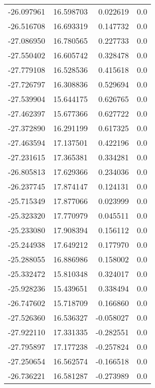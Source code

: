 \begin{tabular}{rrrr}
      -26.097961 &        16.598703 &    0.022619 &   0.0 \\
      -26.516708 &        16.693319 &    0.147732 &   0.0 \\
      -27.086950 &        16.780565 &    0.227733 &   0.0 \\
      -27.550402 &        16.605742 &    0.328478 &   0.0 \\
      -27.779108 &        16.528536 &    0.415618 &   0.0 \\
      -27.726797 &        16.308836 &    0.529694 &   0.0 \\
      -27.539904 &        15.644175 &    0.626765 &   0.0 \\
      -27.462397 &        15.677366 &    0.627722 &   0.0 \\
      -27.372890 &        16.291199 &    0.617325 &   0.0 \\
      -27.463594 &        17.137501 &    0.422196 &   0.0 \\
      -27.231615 &        17.365381 &    0.334281 &   0.0 \\
      -26.805813 &        17.629366 &    0.234036 &   0.0 \\
      -26.237745 &        17.874147 &    0.124131 &   0.0 \\
      -25.715349 &        17.877066 &    0.023999 &   0.0 \\
      -25.323320 &        17.770979 &    0.045511 &   0.0 \\
      -25.233080 &        17.908394 &    0.156112 &   0.0 \\
      -25.244938 &        17.649212 &    0.177970 &   0.0 \\
      -25.288055 &        16.886986 &    0.158002 &   0.0 \\
      -25.332472 &        15.810348 &    0.324017 &   0.0 \\
      -25.928236 &        15.439651 &    0.338494 &   0.0 \\
      -26.747602 &        15.718709 &    0.166860 &   0.0 \\
      -27.526360 &        16.536327 &   -0.058027 &   0.0 \\
      -27.922110 &        17.331335 &   -0.282551 &   0.0 \\
      -27.795897 &        17.177238 &   -0.257824 &   0.0 \\
      -27.250654 &        16.562574 &   -0.166518 &   0.0 \\
      -26.736221 &        16.581287 &   -0.273989 &   0.0 \\

\end{tabular}
